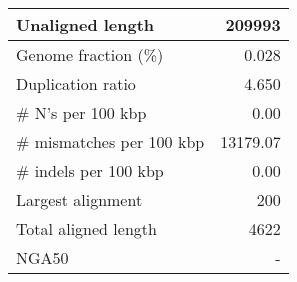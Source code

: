 \documentclass[12pt,a4paper]{article}
\begin{document}
\begin{table}[ht]
\begin{center}
\begin{tabular}{|l*{1}{|r}|}
Unaligned length & 209993 \\ \hline
Genome fraction (\%) & 0.028 \\ \hline
Duplication ratio & 4.650 \\ \hline
\# N's per 100 kbp & 0.00 \\ \hline
\# mismatches per 100 kbp & 13179.07 \\ \hline
\# indels per 100 kbp & 0.00 \\ \hline
Largest alignment & 200 \\ \hline
Total aligned length & 4622 \\ \hline
NGA50 & - \\ \hline
\end{tabular}
\end{center}
\end{table}
\end{document}
